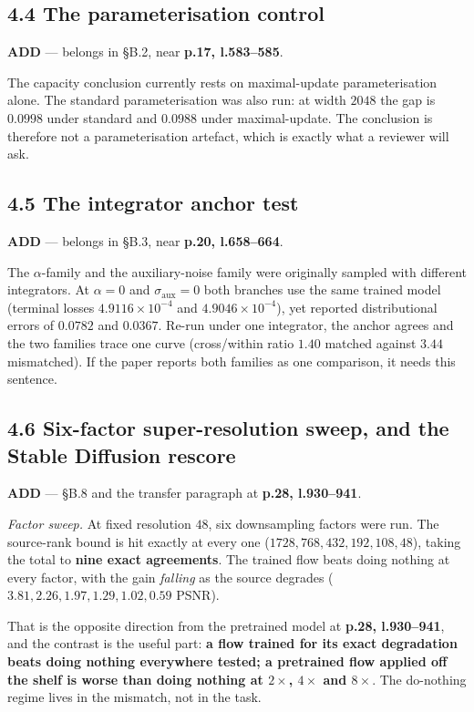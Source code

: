 \documentclass[11pt]{article}
\newcommand{\ADD}{\textcolor{add}{\textbf{ADD}}}
\newcommand{\pl}[2]{\textbf{p.#1, l.#2}}
\begin{document}
\subsection*{4.4 The parameterisation control}

\ADD{} --- belongs in \S B.2, near \pl{17}{583--585}.

The capacity conclusion currently rests on maximal-update parameterisation alone. The standard
parameterisation was also run: at width $2048$ the gap is $0.0998$ under standard and $0.0988$
under maximal-update. The conclusion is therefore not a parameterisation artefact, which is
exactly what a reviewer will ask.

\subsection*{4.5 The integrator anchor test}

\ADD{} --- belongs in \S B.3, near \pl{20}{658--664}.

The $\alpha$-family and the auxiliary-noise family were originally sampled with different
integrators. At $\alpha=0$ and $\sigma_{\mathrm{aux}}=0$ both branches use the same trained model
(terminal losses $4.9116\times10^{-4}$ and $4.9046\times10^{-4}$), yet reported distributional
errors of $0.0782$ and $0.0367$. Re-run under one integrator, the anchor agrees and the two
families trace one curve (cross/within ratio $1.40$ matched against $3.44$ mismatched). If the
paper reports both families as one comparison, it needs this sentence.

\subsection*{4.6 Six-factor super-resolution sweep, and the Stable Diffusion rescore}

\ADD{} --- \S B.8 and the transfer paragraph at \pl{28}{930--941}.

\emph{Factor sweep.} At fixed resolution $48$, six downsampling factors were run. The source-rank
bound is hit exactly at every one ($1728, 768, 432, 192, 108, 48$), taking the total to
\textbf{nine exact agreements}. The trained flow beats doing nothing at every factor, with the
gain \emph{falling} as the source degrades ($3.81, 2.26, 1.97, 1.29, 1.02, 0.59$ PSNR).

That is the opposite direction from the pretrained model at \pl{28}{930--941}, and the contrast
is the useful part: \textbf{a flow trained for its exact degradation beats doing nothing
everywhere tested; a pretrained flow applied off the shelf is worse than doing nothing at
$2\times$, $4\times$ and $8\times$}. The do-nothing regime lives in the mismatch, not in the task.
\end{document}
